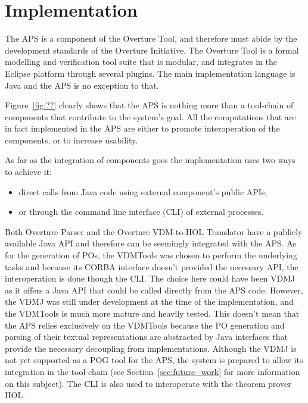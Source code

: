 \documentclass[]{article}
\begin{document}
\section{Implementation}
\label{sec:implementation}

The APS is a component of the Overture Tool, and therefore must abide by the development standards of the Overture Initiative.
The Overture Tool is a formal modelling and verification tool suite that is modular, and integrates in the Eclipse platform through several plugins.
The main implementation language is Java and the APS is no exception to that.

Figure~\ref{fig:??} clearly shows that the APS is nothing more than a tool-chain of components that contribute to the system's goal.
All the computations that are in fact implemented in the APS are either to promote interoperation of the components, or to increase usability.

As far as the integration of components goes the implementation uses two ways to achieve it:
\begin{itemize}
  \item direct calls from Java code using external component's public APIs;
  \item or through the command line interface (CLI) of external processes.
\end{itemize}

Both Overture Parser and the Overture VDM-to-HOL Translator have a publicly available Java API and therefore can be seemingly integrated with the APS.
As for the generation of POs, the VDMTools was chosen to perform the underlying tasks and because its CORBA interface doesn't provided the necessary API, the interoperation is done though the CLI.
The choice here could have been VDMJ as it offers a Java API that could be called directly from the APS code.
However, the VDMJ was still under development at the time of the implementation, and the VDMTools is much more mature and heavily tested.
This doesn't mean that the APS relies exclusively on the VDMTools because the PO generation and parsing of their textual representations are abstracted by Java interfaces that provide the necessary decoupling from implementations.
Although the VDMJ is not yet supported as a POG tool for the APS, the system is prepared to allow its integration in the tool-chain (see Section~\ref{sec:future_work} for more information on this subject).
The CLI is also used to interoperate with the theorem prover HOL.
\end{document}
